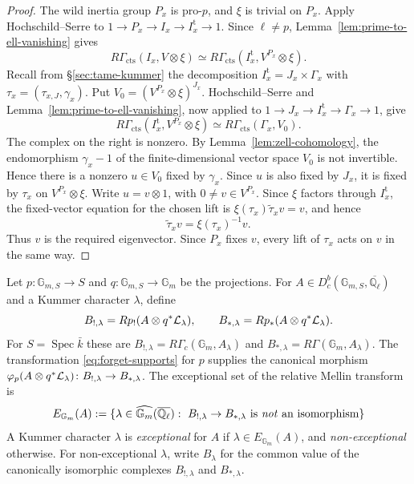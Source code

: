 \documentclass[12pt,reqno]{amsart}
\theoremstyle{definition}
\theoremstyle{plain}
\theoremstyle{definition}
\theoremstyle{remark}
\newcommand{\bbG}{\mathbb{G}}  \newcommand{\bbH}{\mathbb{H}}
\newcommand{\bbQ}{\mathbb{Q}}  \newcommand{\bbR}{\mathbb{R}}
\newcommand{\ol}[1]{\overline{#1}}
\newcommand{\Ql}{\bbQ_{\ell}}
\newcommand{\Db}{D^b_c}
\newcommand{\Gm}{\bbG_m}
\begin{document}
\begin{proof}
The wild inertia group \(P_x\) is pro-\(p\), and \(\xi\) is trivial on \(P_x\).  Apply
Hochschild--Serre to
\(1\to P_x\to I_x\to I_x^{\mathrm t}\to1\).  Since \(\ell\neq p\),
Lemma~\ref{lem:prime-to-ell-vanishing} gives
\[
 R\Gamma_{\mathrm{cts}}(I_x,V\otimes\xi)
 \simeq R\Gamma_{\mathrm{cts}}(I_x^{\mathrm t},V^{P_x}\otimes\xi).
\]
Recall from \S\ref{sec:tame-kummer} the decomposition \(I_x^{\mathrm t}=J_x\times\Gamma_x\) with
\(\tau_x=(\tau_{x,J},\gamma_x)\).  Put \(V_0=(V^{P_x}\otimes\xi)^{J_x}\).  Hochschild--Serre and
Lemma~\ref{lem:prime-to-ell-vanishing}, now applied to
\(1\to J_x\to I_x^{\mathrm t}\to\Gamma_x\to1\), give
\[
 R\Gamma_{\mathrm{cts}}(I_x^{\mathrm t},V^{P_x}\otimes\xi)
 \simeq R\Gamma_{\mathrm{cts}}(\Gamma_x,V_0).
\]
The complex on the right is nonzero.  By Lemma~\ref{lem:zell-cohomology}, the endomorphism
\(\gamma_x-1\) of the finite-dimensional vector space \(V_0\) is not invertible.  Hence there is
a nonzero \(u\in V_0\) fixed by \(\gamma_x\).  Since \(u\) is also fixed by \(J_x\), it is
fixed by \(\tau_x\) on \(V^{P_x}\otimes\xi\).  Write \(u=v\otimes1\), with
\(0\neq v\in V^{P_x}\).  Since \(\xi\) factors through \(I_x^{\mathrm t}\), the fixed-vector equation
for the chosen lift is
\(\xi(\tau_x)\widetilde\tau_x v=v\), and hence
\[
        \widetilde\tau_x v=\xi(\tau_x)^{-1}v.
\]
Thus \(v\) is the required eigenvector.  Since \(P_x\) fixes \(v\), every lift of
\(\tau_x\) acts on \(v\) in the same way.
\end{proof}

Let \(p:\bbG_{m,S}\to S\) and \(q:\bbG_{m,S}\to\Gm\) be the projections.  For
\(A\in\Db(\bbG_{m,S},\ol\Ql)\) and a Kummer character \(\lambda\), define
\[
        B_{!,\lambda}=Rp_!(A\otimes q^*\mathcal{L}_\lambda),
        \qquad
        B_{*,\lambda}=Rp_*(A\otimes q^*\mathcal{L}_\lambda).
\]
For \(S=\operatorname{Spec}\bar k\) these are \(B_{!,\lambda}=R\Gamma_c(\Gm,A_\lambda)\) and
\(B_{*,\lambda}=R\Gamma(\Gm,A_\lambda)\).  The transformation \eqref{eq:forget-supports} for \(p\) supplies
the canonical morphism
\(\varphi_p(A\otimes q^*\mathcal{L}_\lambda)\colon B_{!,\lambda}\to B_{*,\lambda}\).  The exceptional set of
the relative Mellin transform is
\begin{equation}
\label{eq:relative-exceptional-set}
        E_{\Gm}(A):=
        \{\lambda\in\widehat{\Gm}(\ol\Ql):\ B_{!,\lambda}\to B_{*,\lambda}
        \text{ is \emph{not} an isomorphism}\}
\end{equation}
A Kummer character \(\lambda\) is \emph{exceptional} for \(A\) if
\(\lambda\in E_{\Gm}(A)\), and \emph{non-exceptional} otherwise.  For non-exceptional \(\lambda\), write
\(B_\lambda\) for the common value of the canonically isomorphic complexes \(B_{!,\lambda}\) and
\(B_{*,\lambda}\).
\end{document}
